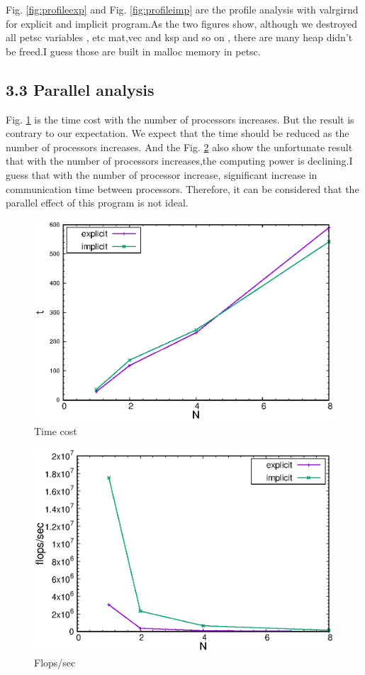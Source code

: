 \documentclass[12pt]{article}
\begin{document}
Fig. \ref{fig:profileexp} and Fig. \ref{fig:profileimp} are the profile analysis with valrgirnd for explicit and implicit program.As the two figures show, although we destroyed all petsc variables , etc mat,vec and ksp and so on , there are many heap didn't be freed.I guess those are built in malloc memory in petsc.


\subsection*{3.3 Parallel analysis}
Fig. \ref{fig:time} is the time cost with the number of processors increases. But the result is contrary to our expectation. We expect that the time should be reduced as the number of processors increases. And the Fig. \ref{fig:flops} also show the unfortunate result that with the number of processors increases,the computing power is declining.I guess that with the number of processor increase, significant increase in communication time between processors. Therefore, it can be considered that the parallel effect of this program is not ideal.

\begin{figure}
    \centering
    \includegraphics{img/time.eps}
    \caption{Time cost}
    \label{fig:time}
\end{figure}

\begin{figure}
    \centering
    \includegraphics{img/flops.eps}
    \caption{Flops/sec}
    \label{fig:flops}
\end{figure}
\end{document}
